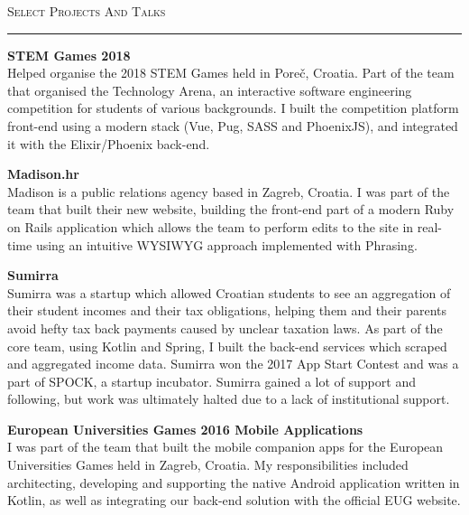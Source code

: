 \documentclass[10pt, a4paper, final, onecolumn, oneside, notitlepage]{article}
\newcommand{\sectionspacing}[0]{ \vspace{10pt} } %
\newcommand{\halfsectionspacing}[0]{ \vspace{4pt} }
\newcommand{\sectionrule}[0]{ \rule[6pt]{\textwidth}{0.5pt} } %
\renewcommand{\section}[1]{\sectionspacing {\large \scshape #1} \sectionrule}
\begin{document}
\begin{center}

\section{Select Projects And Talks}
\begin{flushleft}
\textbf{STEM Games 2018} \\
Helped organise the 2018 STEM Games held in Poreč, Croatia. Part of the team that organised the Technology Arena, an interactive software engineering competition for students of various backgrounds. I built the competition platform front-end using a modern stack (Vue, Pug, SASS and PhoenixJS), and integrated it with the Elixir/Phoenix back-end.

\halfsectionspacing

\textbf{Madison.hr} \\
Madison is a public relations agency based in Zagreb, Croatia. I was part of the team that built their new website, building the front-end part of a modern Ruby on Rails application which allows the team to perform edits to the site in real-time using an intuitive WYSIWYG approach implemented with Phrasing.

\halfsectionspacing

\textbf{Sumirra} \\
Sumirra was a startup which allowed Croatian students to see an aggregation of their student incomes and their tax obligations, helping them and their parents avoid hefty tax back payments caused by unclear taxation laws. As part of the core team, using Kotlin and Spring, I built the back-end services which scraped and aggregated income data. Sumirra won the 2017 App Start Contest and was a part of SPOCK, a startup incubator. Sumirra gained a lot of support and following, but work was ultimately halted due to a lack of institutional support.

\halfsectionspacing

\textbf{European Universities Games 2016 Mobile Applications} \\
I was part of the team that built the mobile companion apps for the European Universities Games held in Zagreb, Croatia. My responsibilities included architecting, developing and supporting the native Android application written in Kotlin, as well as integrating our back-end solution with the official EUG website.

\halfsectionspacing


\end{flushleft}
\end{center}
\end{document}
